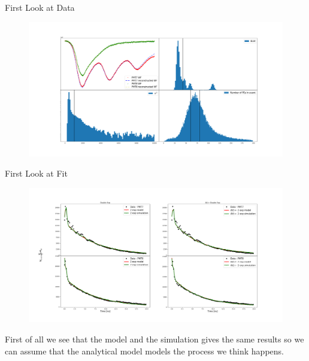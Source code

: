 \documentclass{beamer}
\begin{document}
\begin{frame}{First Look at Data}
\begin{figure}[h]
\includegraphics[width=1\textwidth]{data_event.png}
\end{figure}
\end{frame}

\begin{frame}{First Look at Fit}
\begin{figure}[h]
\includegraphics[width=1\textwidth]{fitA.png}
\end{figure}
First of all we see that the model and the simulation gives the same results so we can assume that the analytical model models the process we think happens.
\end{frame}
\end{document}
